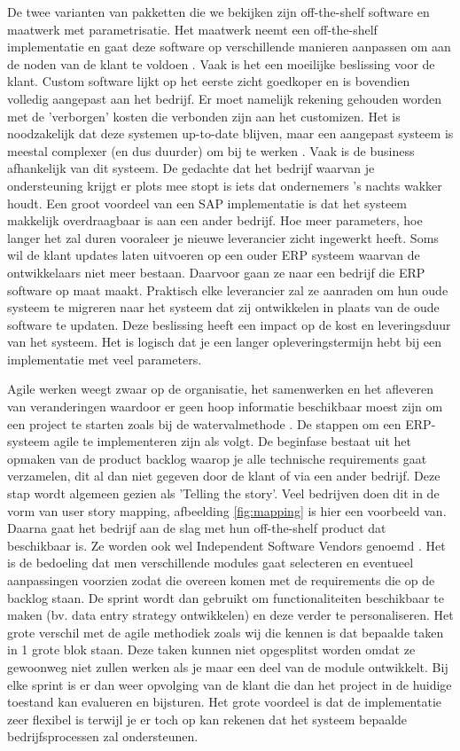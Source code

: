 De twee varianten van pakketten die we bekijken zijn off-the-shelf software en maatwerk met parametrisatie. Het maatwerk neemt een off-the-shelf implementatie en gaat deze software op verschillende manieren aanpassen om aan de noden van de klant te voldoen \autocite{Vollmer2016}. Vaak is het een moeilijke beslissing voor de klant. Custom software lijkt op het eerste zicht goedkoper en is bovendien volledig aangepast aan het bedrijf. Er moet namelijk rekening gehouden worden met de 'verborgen' kosten die verbonden zijn aan het customizen. Het is noodzakelijk dat deze systemen up-to-date blijven, maar een aangepast systeem is meestal complexer (en dus duurder) om bij te werken \autocite{Bdc2019}. Vaak is de business afhankelijk van dit systeem. De gedachte dat het bedrijf waarvan je ondersteuning krijgt er plots mee stopt is iets dat ondernemers 's nachts wakker houdt. Een groot voordeel van een SAP implementatie is dat het systeem makkelijk overdraagbaar is aan een ander bedrijf. Hoe meer parameters, hoe langer het zal duren vooraleer je nieuwe leverancier zicht ingewerkt heeft. Soms wil de klant updates laten uitvoeren op een ouder ERP systeem waarvan de ontwikkelaars niet meer bestaan. Daarvoor gaan ze naar een bedrijf die ERP software op maat maakt. Praktisch elke leverancier zal ze aanraden om hun oude systeem te migreren naar het systeem dat zij ontwikkelen in plaats van de oude software te updaten. Deze beslissing heeft een impact op de kost en leveringsduur van het systeem. Het is logisch dat je een langer opleveringstermijn hebt bij een implementatie met veel parameters.

Agile werken weegt zwaar op de organisatie, het samenwerken en het afleveren van veranderingen waardoor er geen hoop informatie beschikbaar moest zijn om een project te starten zoals bij de watervalmethode \autocite{Mrpeasy2018}. De stappen om een ERP-systeem agile te implementeren zijn als volgt. De beginfase bestaat uit het opmaken van de product backlog waarop je alle technische requirements gaat verzamelen, dit al dan niet gegeven door de klant of via een ander bedrijf. Deze stap wordt algemeen gezien als 'Telling the story'. Veel bedrijven doen dit in de vorm van user story mapping, afbeelding \ref{fig:mapping} is hier een voorbeeld van. Daarna gaat het bedrijf aan de slag met hun off-the-shelf product dat beschikbaar is. Ze worden ook wel Independent Software Vendors genoemd \autocite{Mrpeasy2018}. Het is de bedoeling dat men verschillende modules gaat selecteren en eventueel aanpassingen voorzien zodat die overeen komen met de requirements die op de backlog staan. De sprint wordt dan gebruikt om functionaliteiten beschikbaar te maken (bv. data entry strategy ontwikkelen) en deze verder te personaliseren. Het grote verschil met de agile methodiek zoals wij die kennen is dat bepaalde taken in 1 grote blok staan. Deze taken kunnen niet opgesplitst worden omdat ze gewoonweg niet zullen werken als je maar een deel van de module ontwikkelt. Bij elke sprint is er dan weer opvolging van de klant die dan het project in de huidige toestand kan evalueren en bijsturen. Het grote voordeel is dat de implementatie zeer flexibel is terwijl je er toch op kan rekenen dat het systeem bepaalde bedrijfsprocessen zal ondersteunen.

